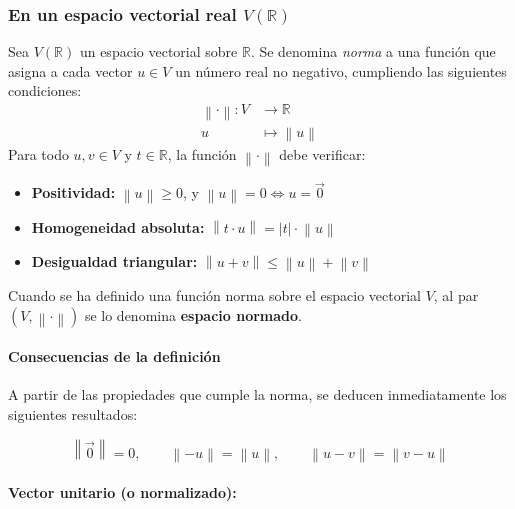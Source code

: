 \subsubsection{En un espacio vectorial real \(V(\mathbb{R})\)}

Sea \(V(\mathbb{R})\) un espacio vectorial sobre \(\mathbb{R}\). Se denomina \textit{norma} a una función que asigna a cada vector \(u \in V\) un número real no negativo, cumpliendo las siguientes condiciones:
\begin{align*}
  \left\lVert \cdot \right\rVert : V &\longrightarrow \mathbb{R} \\
  u &\longmapsto \left\lVert u \right\rVert
\end{align*}
Para todo \(u, v \in V\) y \(t \in \mathbb{R}\), la función \(\left\lVert \cdot \right\rVert\) debe verificar:

\begin{itemize}
  \item \textbf{Positividad:} \(\left\lVert u \right\rVert \geq 0\), y \(\left\lVert u \right\rVert = 0 \iff u = \vec{0}\)
  \item \textbf{Homogeneidad absoluta:} \(\left\lVert t \cdot u \right\rVert = \left|t\right| \cdot \left\lVert u \right\rVert\)
  \item \textbf{Desigualdad triangular:} \(\left\lVert u + v \right\rVert \leq \left\lVert u \right\rVert + \left\lVert v \right\rVert\)
\end{itemize}

Cuando se ha definido una función norma sobre el espacio vectorial \(V\), al par \((V, \left\lVert \cdot \right\rVert)\) se lo denomina \textbf{espacio normado}.

\vspace{5mm}

\paragraph{Consecuencias de la definición}

A partir de las propiedades que cumple la norma, se deducen inmediatamente los siguientes resultados:

\[
  \left\lVert \vec{0} \right\rVert = 0, \qquad
  \left\lVert -u \right\rVert = \left\lVert u \right\rVert, \qquad
  \left\lVert u - v \right\rVert = \left\lVert v - u \right\rVert
\]

\paragraph{Vector unitario (o normalizado):}

